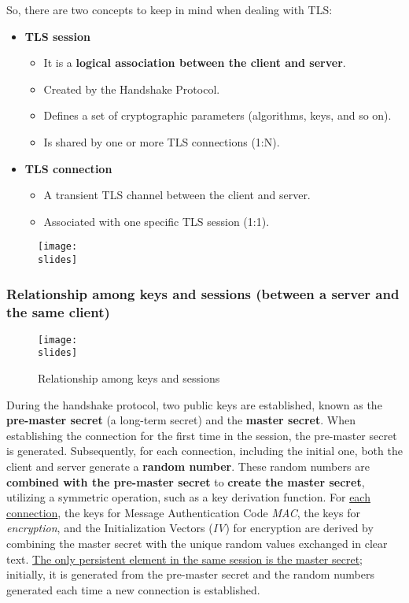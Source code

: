 So, there are two concepts to keep in mind when dealing with TLS:
\begin{itemize}
    \item \textbf{TLS session}
          \begin{itemize}
              \item It is a \textbf{logical association between the client and server}.
              \item Created by the Handshake Protocol.
              \item Defines a set of cryptographic parameters (algorithms, keys, and so on).
              \item Is shared by one or more TLS connections (1:N).
          \end{itemize}
    \item \textbf{TLS connection}
          \begin{itemize}
              \item A transient TLS channel between the client and server.
              \item Associated with one specific TLS session (1:1).
          \end{itemize}
\end{itemize}

\begin{figure}[h]
    \centering
    \texttt{[image: \\slides]}
\end{figure}


\subsubsection{Relationship among keys and sessions (between a server and the same client)}\label{chap:tls-session-keys}

\begin{figure}[h]
    \centering
    \texttt{[image: \\slides]}
    \caption{Relationship among keys and sessions}
    \label{fig:tls-session-keys}
\end{figure}

During the handshake protocol, two public keys are established, known as the \textbf{pre-master secret} (a long-term secret) and the \textbf{master secret}. When establishing the connection for the first time in the session, the pre-master secret is generated. Subsequently, for each connection, including the initial one, both the client and server generate a \textbf{random number}. These random numbers are \textbf{combined with the pre-master secret} to \textbf{create the master secret}, utilizing a symmetric operation, such as a key derivation function. For \underline{each connection}, the keys for Message Authentication Code \textit{MAC}, the keys for \textit{encryption}, and the Initialization Vectors (\textit{IV}) for encryption are derived by combining the master secret with the unique random values exchanged in clear text. \ul{The only persistent element in the same session is the master secret}; initially, it is generated from the pre-master secret and the random numbers generated each time a new connection is established.


